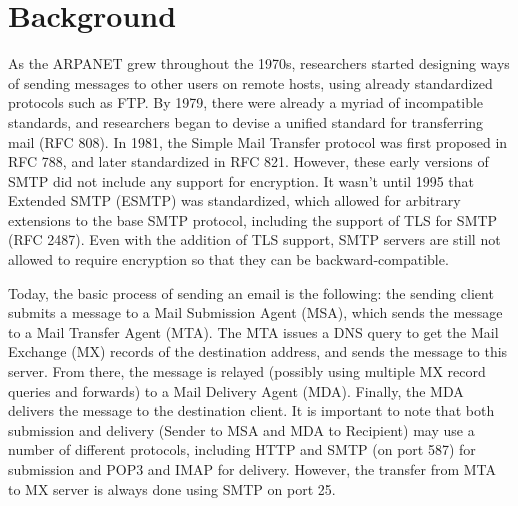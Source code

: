 \section{Background}
As the ARPANET grew throughout the 1970s, researchers started designing ways of sending messages to other users on remote hosts, using already standardized protocols such as FTP.  By 1979, there were already a myriad of incompatible standards, and researchers began to devise a unified standard for transferring mail (RFC 808).  In 1981, the Simple Mail Transfer protocol was first proposed in RFC 788, and later standardized in RFC 821. However, these early versions of SMTP did not include any support for encryption. It wasn't until 1995 that Extended SMTP (ESMTP) was standardized, which allowed for arbitrary extensions to the base SMTP protocol, including the support of TLS for SMTP (RFC 2487).  Even with the addition of TLS support, SMTP servers are still not allowed to require encryption so that they can be backward-compatible.

Today, the basic process of sending an email is the following: the sending client submits a message to a Mail Submission Agent (MSA), which sends the message to a Mail Transfer Agent (MTA).  The MTA issues a DNS query to get the Mail Exchange (MX) records of the destination address, and sends the message to this server.  From there, the message is relayed (possibly using multiple MX record queries and forwards) to a Mail Delivery Agent (MDA).  Finally, the MDA delivers the message to the destination client.  It is important to note that both submission and delivery (Sender to MSA and MDA to Recipient) may use a number of different protocols, including HTTP and SMTP (on port 587) for submission and POP3 and IMAP for delivery.  However, the transfer from MTA to MX server is always done using SMTP on port 25.
